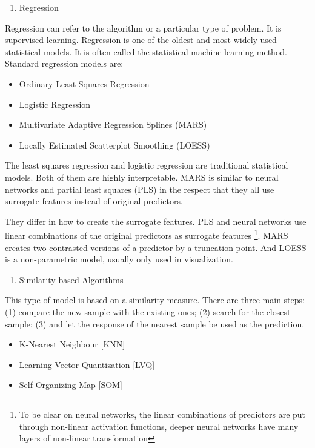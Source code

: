 \documentclass[12pt,]{krantz}
\providecommand{\tightlist}{%
  \setlength{\itemsep}{0pt}\setlength{\parskip}{0pt}}
\theoremstyle{definition}
\theoremstyle{definition}
\theoremstyle{remark}
\begin{document}
\begin{enumerate}
\def\labelenumi{\arabic{enumi}.}
\tightlist
\item
  Regression
\end{enumerate}

Regression can refer to the algorithm or a particular type of problem.
It is supervised learning. Regression is one of the oldest and most
widely used statistical models. It is often called the statistical
machine learning method. Standard regression models are:

\begin{itemize}
\tightlist
\item
  Ordinary Least Squares Regression
\item
  Logistic Regression
\item
  Multivariate Adaptive Regression Splines (MARS)
\item
  Locally Estimated Scatterplot Smoothing (LOESS)
\end{itemize}

The least squares regression and logistic regression are traditional
statistical models. Both of them are highly interpretable. MARS is
similar to neural networks and partial least squares (PLS) in the
respect that they all use surrogate features instead of original
predictors.

They differ in how to create the surrogate features. PLS and neural
networks use linear combinations of the original predictors as surrogate
features \footnote{To be clear on neural networks, the linear
  combinations of predictors are put through non-linear activation
  functions, deeper neural networks have many layers of non-linear
  transformation}. MARS creates two contrasted versions of a predictor
by a truncation point. And LOESS is a non-parametric model, usually only
used in visualization.

\begin{enumerate}
\def\labelenumi{\arabic{enumi}.}
\setcounter{enumi}{1}
\tightlist
\item
  Similarity-based Algorithms
\end{enumerate}

This type of model is based on a similarity measure. There are three
main steps: (1) compare the new sample with the existing ones; (2)
search for the closest sample; (3) and let the response of the nearest
sample be used as the prediction.

\begin{itemize}
\tightlist
\item
  K-Nearest Neighbour {[}KNN{]}
\item
  Learning Vector Quantization {[}LVQ{]}
\item
  Self-Organizing Map {[}SOM{]}
\end{itemize}
\end{document}

